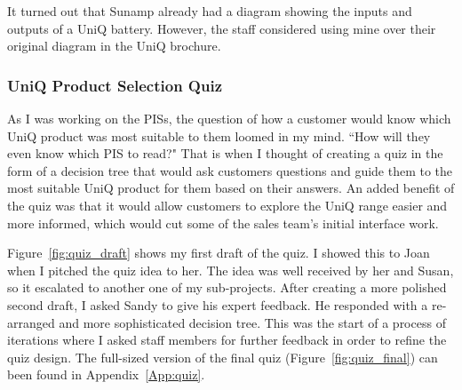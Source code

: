 It turned out that Sunamp already had a diagram showing the inputs and outputs of a UniQ battery.
However, the staff considered using mine over their original diagram in the UniQ brochure.



\subsubsection{UniQ Product Selection Quiz} \label{sec:quiz}

As I was working on the PISs, the question of how a customer would know which UniQ product was most suitable to them loomed in my mind.
``How will they even know which PIS to read?"
That is when I thought of creating a quiz in the form of a decision tree that would ask customers questions and guide them to the most suitable UniQ product for them based on their answers.
An added benefit of the quiz was that it would allow customers to explore the UniQ range easier and more informed, which would cut some of the sales team's initial interface work.

Figure~\ref{fig:quiz_draft} shows my first draft of the quiz.
I showed this to Joan when I pitched the quiz idea to her.
The idea was well received by her and Susan, so it escalated to another one of my sub-projects.
After creating a more polished second draft, I asked Sandy to give his expert feedback.
He responded with a re-arranged and more sophisticated decision tree.
This was the start of a process of iterations where I asked staff members for further feedback in order to refine the quiz design.
The full-sized version of the final quiz (Figure~\ref{fig:quiz_final}) can been found in Appendix~\ref{App:quiz}.




